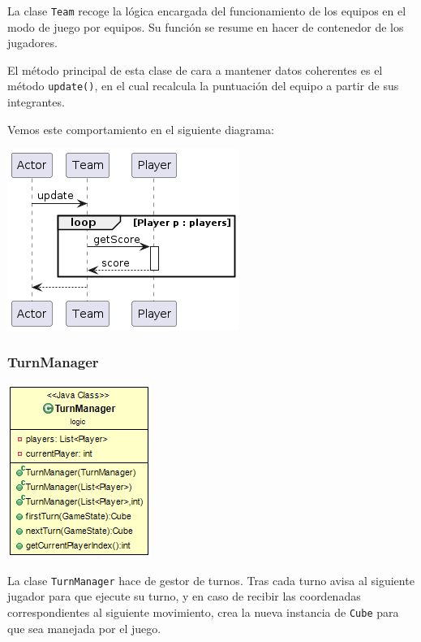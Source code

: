 \documentclass[12pt,a4paper,openright]{book}
\theoremstyle{break}
\begin{document}
La clase \texttt{Team} recoge la lógica encargada del funcionamiento de los equipos en el modo de juego por equipos. Su función se resume en hacer de contenedor de los jugadores.

El método principal de esta clase de cara a mantener datos coherentes es el método \texttt{update()}, en el cual recalcula la puntuación del equipo a partir de sus integrantes.

Vemos este comportamiento en el siguiente diagrama:

\begin{center}
\includegraphics[scale=0.75]{Team.update()-sprint7.png} 
\end{center}

\newpage

\subsubsection{TurnManager}

\begin{center}
\includegraphics[scale=0.75]{TurnManager-sprint7.png} 
\end{center}

La clase \texttt{TurnManager} hace de gestor de turnos. Tras cada turno avisa al siguiente jugador para que ejecute su turno, y en caso de recibir las coordenadas correspondientes al siguiente movimiento, crea la nueva instancia de \texttt{Cube} para que sea manejada por el juego.
\end{document}
